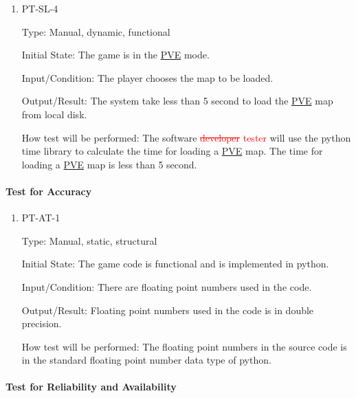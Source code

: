 \documentclass[12pt, titlepage]{article}
\begin{document}
\begin{enumerate}
\item{PT-SL-4\\}

Type: Manual, dynamic, functional
					
Initial State: The game is in the \underline{PVE} mode. 
					
Input/Condition: The player chooses the map to be loaded.
					
Output/Result: The system take less than 5 second to load the \underline{PVE} map from local disk.
					
How test will be performed: The software  \textcolor{red}{\sout{developer} tester} will use the python time library to calculate the time for loading a \underline{PVE} map. The time for loading a \underline{PVE} map is less than 5 second.

\end{enumerate}

\paragraph{Test for Accuracy}

\begin{enumerate}

\item{PT-AT-1\\}

Type: Manual, static, structural
					
Initial State: The game code is functional and is implemented in python.
					
Input/Condition: There are floating point numbers used in the code.
					
Output/Result: Floating point numbers used in the code is in double precision.
					
How test will be performed: The floating point numbers in the source code is in the standard floating point number data type of python.

\end{enumerate}

\paragraph{Test for Reliability and Availability}
\end{document}
